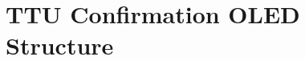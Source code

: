 \documentclass[
  letterpaper,
  DIV=11,
  numbers=noendperiod,
  oneside]{scrreprt}
\begin{document}
\hypertarget{apen:oledex}{%
\section{TTU Confirmation OLED Structure}\label{apen:oledex}}

\begin{figure}

\begin{minipage}[t]{0.50\linewidth}

{\centering 


}

\subcaption{\label{fig-dpaoled}}
\end{minipage}%
%
\begin{minipage}[t]{0.50\linewidth}

{\centering 

}
\end{minipage}
\end{figure}
\end{document}
